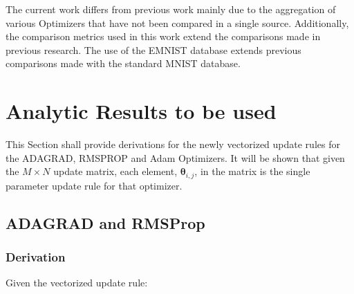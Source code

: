 \documentclass{article}
\begin{document}
The current work differs from previous work mainly due to the aggregation of various Optimizers that have not been compared in a single source. Additionally, the comparison metrics used in this work extend the comparisons made in previous research. The use of the EMNIST database extends previous comparisons made with the standard MNIST database.

\section{Analytic Results to be used}
This Section shall provide derivations for the newly vectorized update rules for the ADAGRAD, RMSPROP and Adam Optimizers. It will be shown that given the $M \times N$ update matrix, each element, $\boldsymbol{\theta}_{i,j}$,  in the matrix is the single parameter update rule for that optimizer.

\subsection{ADAGRAD and RMSProp}
\subsubsection{Derivation}
Given the vectorized update rule: \hfill\newline
\end{document}
